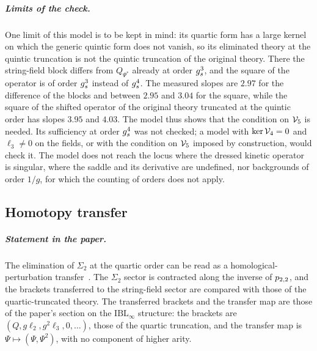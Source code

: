\subparagraph{Limits of the check.}
One limit of this model is to be kept in mind: its quartic form has a large kernel on which the generic quintic form does not vanish, so its eliminated theory at the quintic truncation is not the quintic truncation of the original theory.
There the string-field block differs from $Q_{\Psi^*}$ already at order $g_s^3$, and the square of the operator is of order $g_s^3$ instead of $g_s^4$.
The measured slopes are $2.97$ for the difference of the blocks and between $2.95$ and $3.04$ for the square, while the square of the shifted operator of the original theory truncated at the quintic order has slopes $3.95$ and $4.03$.
The model thus shows that the condition on $\mathcal{V}_{5}$ is needed.
Its sufficiency at order $g_s^4$ was not checked; a model with $\ker \mathcal{V}_{4} = 0$ and $\ell_3 \neq 0$ on the fields, or with the condition on $\mathcal{V}_{5}$ imposed by construction, would check it.
The model does not reach the locus where the dressed kinetic operator is singular, where the saddle and its derivative are undefined, nor backgrounds of order $1/g$, for which the counting of orders does not apply.

\subsection{Homotopy transfer}
\label{fdm:sec:transfer}

\subparagraph{Statement in the paper.}
The elimination of $\Sigma_2$ at the quartic order can be read as a homological-perturbation transfer~\cite{Crainic:2004:PerturbationLemmaDeformations}.
The $\Sigma_2$ sector is contracted along the inverse of $p_{2,2}$, and the brackets transferred to the string-field sector are compared with those of the quartic-truncated theory.
The transferred brackets and the transfer map are those of the paper's section on the $\mathrm{IBL}_\infty$ structure: the brackets are $(Q, g \ell_2, g^2 \ell_3, 0, \dots)$, those of the quartic truncation, and the transfer map is $\Psi \mapsto (\Psi, \Psi^2)$, with no component of higher arity.

